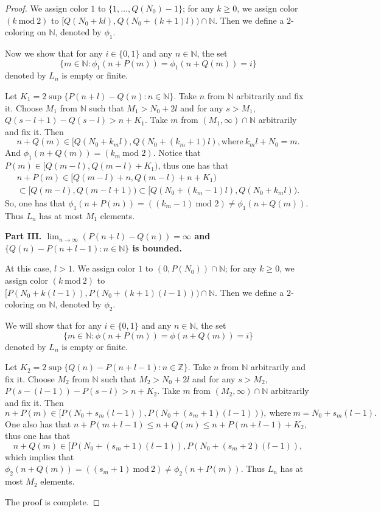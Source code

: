 \documentclass[reqno,12pt]{amsart}
\def \N {\mathbb N}
\def \Z {\mathbb Z}
\numberwithin{equation}{section}
\begin{document}
\begin{proof}
	We assign color $1$ to $\{1,\ldots,Q(N_0)-1\}$; for any $k\ge 0$, we assign color $(k\ \text{mod}\ 2)$ to $[Q(N_0+kl),Q(N_0+(k+1)l))\cap \N$. Then we define a $2$-coloring on $\N$, denoted by $\phi_1$.
		
Now we show that for any $i\in \{0,1\}$ and any $n\in \N$, the set $$\{m\in \N:\phi_1(n+P(m))=\phi_1(n+Q(m))=i\}$$denoted by $L_n$ is empty or finite.

Let $K_1=2\sup \{P(n+l)-Q(n):n\in\N\}$. Take $n$ from $\N$ arbitrarily and fix it.  Choose $M_1$ from $\N$ such that $M_1>N_0+2l$ and for any $s>M_1$, $Q(s-l+1)-Q(s-l)>n+K_1 $. Take $m$ from $(M_1,\infty)\cap \N$ arbitrarily and fix it. Then
$$n+Q(m)\in [Q(N_0+k_ml),Q(N_0+(k_m+1)l), \text{where}\ k_ml+N_0=m.$$
 And $\phi_1(n+Q(m))=(k_m\ \text{mod } 2)$. Notice that $P(m)\in [Q(m-l),Q(m-l)+K_1) $, thus one has that
\begin{equation*}\begin{array}{ll}n+P(m)\in [Q(m-l)+n,Q(m-l)+n+K_1)\\
\subset  [Q(m-l),Q(m-l+1))\subset [Q(N_0+(k_m-1)l),Q(N_0+k_ml)).
\end{array}
\end{equation*}
So, one has that $\phi_1(n+P(m))=((k_m-1)\ \text{mod } 2)\neq \phi_1(n+Q(m)) $. Thus $L_n$ has at most $M_1$ elements.

	
	\noindent \textbf{Part III. $\lim_{n\to\infty}(P(n+l)-Q(n))=\infty$ and $\{Q(n)-P(n+l-1):n\in\N\}$ is bounded.}
	
	At this case, $l>1$. We assign color $1$ to $(0,P(N_0))\cap \N$; for any $k\ge 0$, we assign color $(k\ \text{mod}\ 2)$ to $[P(N_0+k(l-1)),P(N_0+(k+1)(l-1)))\cap \N$. Then we define a $2$-coloring on $\N$, denoted by $\phi_2$.
	
	We will show that for any $i\in \{0,1\}$ and any $n\in \N$, the set $$\{m\in \N:\phi(n+P(m))=\phi(n+Q(m))=i\}$$denoted by $L_n$ is empty or finite.
	
	Let $K_2=2\sup \{Q(n)-P(n+l-1):n\in\Z\}$. Take $n$ from $\N$ arbitrarily and fix it.  Choose $M_2$ from $\N$ such that $M_2>N_0+2l$ and for any $s>M_2 $, $P(s-(l-1))-P(s-l)>n+K_2$. Take $m$ from $(M_2,\infty)\cap \N$ arbitrarily and fix it. Then
$$n+P(m)\in [P(N_0+s_m(l-1)),P(N_0+(s_m+1)(l-1))),\ \text{where}\ m=N_0+s_m(l-1).$$
One also has that $n+P(m+l-1)\leq n+Q(m)\leq n+P(m+l-1)+K_2$, thus one has that
$$n+Q(m)\in [P(N_0+(s_m+1)(l-1)),P(N_0+(s_m+2)(l-1)),$$
which implies that $\phi_2(n+Q(m))=((s_m+1)\ \text{mod}\ 2)\neq \phi_2(n+P(m))$. Thus $L_n$ has at most $M_2$ elements.

	The proof is complete.
\end{proof}
\end{document}
